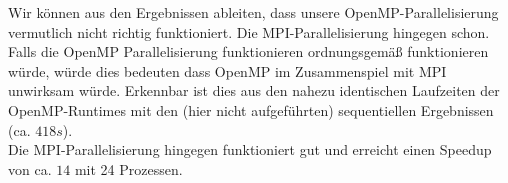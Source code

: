 \documentclass[12pt]{article}
\begin{document}
\begin{sloppypar}
Wir können aus den Ergebnissen ableiten, dass unsere OpenMP-Parallelisierung vermutlich nicht richtig funktioniert. Die MPI-Parallelisierung hingegen schon. Falls die OpenMP Parallelisierung funktionieren ordnungsgemäß funktionieren würde, würde dies bedeuten dass OpenMP im Zusammenspiel mit MPI unwirksam würde. Erkennbar ist dies aus den nahezu identischen Laufzeiten der OpenMP-Runtimes mit den (hier nicht aufgeführten) sequentiellen Ergebnissen (ca. $418s$). \\

Die MPI-Parallelisierung hingegen funktioniert gut und erreicht einen Speedup von ca. $14$ mit 24 Prozessen.

\end{sloppypar}
\end{document}
